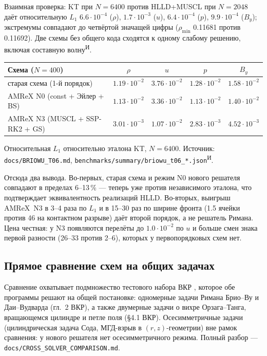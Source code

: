\documentclass[12pt,a4paper]{article}
\newcommand{\code}[1]{\texttt{#1}}
\newcommand{\Iz}{\textsuperscript{\scriptsize И}}    %
\begin{document}
Взаимная проверка: KT при $N=6400$ против HLLD+MUSCL при $N=2048$ даёт
относительную $L_1$ $6.6\!\cdot\!10^{-4}$ ($\rho$), $1.7\!\cdot\!10^{-3}$ ($u$),
$6.4\!\cdot\!10^{-4}$ ($p$), $9.9\!\cdot\!10^{-4}$ ($B_y$); экстремумы совпадают
до четвёртой значащей цифры ($\rho_{\min}$ 0.11681 против 0.11692). Две схемы
без общего кода сходятся к одному слабому решению, включая составную волну\Iz.

\begin{center}\footnotesize\setlength{\tabcolsep}{5pt}
\begin{tabular}{lcccc}
\toprule
Схема ($N=400$) & $\rho$ & $u$ & $p$ & $B_y$ \\
\midrule
старая схема (1-й порядок) & $1.19\!\cdot\!10^{-2}$ & $3.76\!\cdot\!10^{-2}$ & $1.28\!\cdot\!10^{-2}$ & $1.58\!\cdot\!10^{-2}$ \\
AMReX N0 (const + Эйлер + BS)               & $1.13\!\cdot\!10^{-2}$ & $3.36\!\cdot\!10^{-2}$ & $1.13\!\cdot\!10^{-2}$ & $1.40\!\cdot\!10^{-2}$ \\
AMReX N3 (MUSCL + SSP-RK2 + GS)             & $3.01\!\cdot\!10^{-3}$ & $1.07\!\cdot\!10^{-2}$ & $2.83\!\cdot\!10^{-3}$ & $4.52\!\cdot\!10^{-3}$ \\
\bottomrule
\end{tabular}
\end{center}
\noindent\footnotesize
Относительная $L_1$ относительно эталона KT, $N=6400$. Источник:
\code{docs/BRIOWU\_T06.md}, \code{benchmarks/summary/briowu\_t06\_*.json}\Iz.\normalsize

\medskip
Отсюда два вывода. Во-первых, старая схема и режим N0 нового решателя совпадают в
пределах 6--13\,\% --- теперь уже против независимого эталона, что подтверждает
эквивалентность реализаций HLLD. Во-вторых, выигрыш AMReX~N3 в 3--4 раза по
$L_1$ и в 15--30 раз по ширине фронта (1.5 ячейки против 46 на контактном
разрыве) даёт второй порядок, а не решатель Римана. Цена честная: у N3
появляются перелёты до $1.0\!\cdot\!10^{-2}$ по $u$ и больше смен знака первой
разности (26--33 против 2--6), которых у первопорядковых схем нет.

\subsection{Прямое сравнение схем на общих задачах}
\label{sec:res-cmp}

Сравнение охватывает подмножество тестового набора ВКР
\cite{shamanov2025}, которое обе программы решают на общей постановке:
одномерные задачи Римана Брио--Ву и Даи--Вудварда (гл.~2 ВКР), а также
двумерные задачи о вихре Орзага--Танга, вращающемся цилиндре и петле поля
(\S4.1 ВКР). Осесимметричные задачи (цилиндрическая задача Сода, МГД-взрыв в
$(r,z)$-геометрии) вне рамок сравнения: у нового решателя нет
осесимметричного режима. Полный разбор ---
\code{docs/CROSS\_SOLVER\_COMPARISON.md}.
\end{document}
